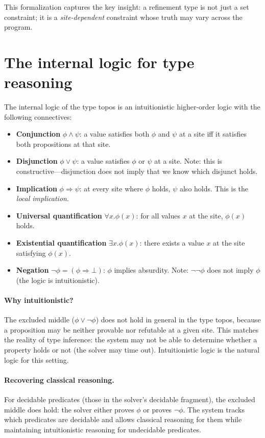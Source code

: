 \documentclass[11pt]{report}
\theoremstyle{definition}
\theoremstyle{plain}
\begin{document}
This formalization captures the key insight: a refinement type is not just a
set constraint; it is a \emph{site-dependent} constraint whose truth may vary
across the program.

\section{The internal logic for type reasoning}

The internal logic of the type topos is an intuitionistic higher-order logic
with the following connectives:

\begin{itemize}[nosep]
  \item \textbf{Conjunction} $\phi \wedge \psi$: a value satisfies both $\phi$
        and $\psi$ at a site iff it satisfies both propositions at that site.
  \item \textbf{Disjunction} $\phi \vee \psi$: a value satisfies $\phi$ or
        $\psi$ at a site. Note: this is constructive---disjunction does not
        imply that we know which disjunct holds.
  \item \textbf{Implication} $\phi \Rightarrow \psi$: at every site where
        $\phi$ holds, $\psi$ also holds. This is the \emph{local implication}.
  \item \textbf{Universal quantification} $\forall x. \phi(x)$: for all
        values $x$ at the site, $\phi(x)$ holds.
  \item \textbf{Existential quantification} $\exists x. \phi(x)$: there
        exists a value $x$ at the site satisfying $\phi(x)$.
  \item \textbf{Negation} $\neg \phi = (\phi \Rightarrow \bot)$: $\phi$
        implies absurdity. Note: $\neg\neg\phi$ does not imply $\phi$
        (the logic is intuitionistic).
\end{itemize}

\paragraph{Why intuitionistic?}
The excluded middle ($\phi \vee \neg\phi$) does not hold in general in the
type topos, because a proposition may be neither provable nor refutable at a
given site. This matches the reality of type inference: the system may not be
able to determine whether a property holds or not (the solver may time out).
Intuitionistic logic is the natural logic for this setting.

\paragraph{Recovering classical reasoning.}
For decidable predicates (those in the solver's decidable fragment), the
excluded middle does hold: the solver either proves $\phi$ or proves
$\neg\phi$. The system tracks which predicates are decidable and allows
classical reasoning for them while maintaining intuitionistic reasoning for
undecidable predicates.
\end{document}
